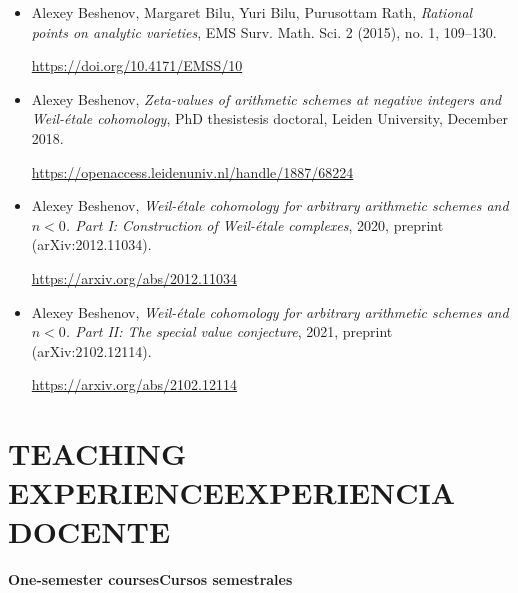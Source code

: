 \documentclass{article}
\newcommand{\biling}[2]{\ifdefined\english#1\fi\ifdefined\spanish#2\fi}
\begin{document}
\begin{itemize}
\item Alexey Beshenov, Margaret Bilu, Yuri Bilu, Purusottam Rath,
  \emph{Rational points on analytic varieties},
  EMS Surv. Math. Sci. 2 (2015), no. 1, 109–130.

  \url{https://doi.org/10.4171/EMSS/10}

\item Alexey Beshenov,
  \emph{Zeta-values of arithmetic schemes at negative integers and Weil-étale cohomology},
  \biling{PhD thesis}{tesis doctoral}, Leiden University, December 2018.

  \url{https://openaccess.leidenuniv.nl/handle/1887/68224}

\item Alexey Beshenov,
  \emph{Weil-étale cohomology for arbitrary arithmetic schemes and $n < 0$.
    Part I: Construction of Weil-étale complexes},
  2020, preprint (arXiv:2012.11034).

  \url{https://arxiv.org/abs/2012.11034}

\item Alexey Beshenov,
  \emph{Weil-étale cohomology for arbitrary arithmetic schemes and $n < 0$.
    Part II: The special value conjecture},
  2021, preprint (arXiv:2102.12114).

  \url{https://arxiv.org/abs/2102.12114}
\end{itemize}

\pagebreak

{\color{RoyalBlue}\section*{\biling{TEACHING EXPERIENCE}{EXPERIENCIA DOCENTE}}}

\noindent\textbf{\biling{One-semester courses}{Cursos semestrales}}

\vspace{0.5em}
\end{document}
